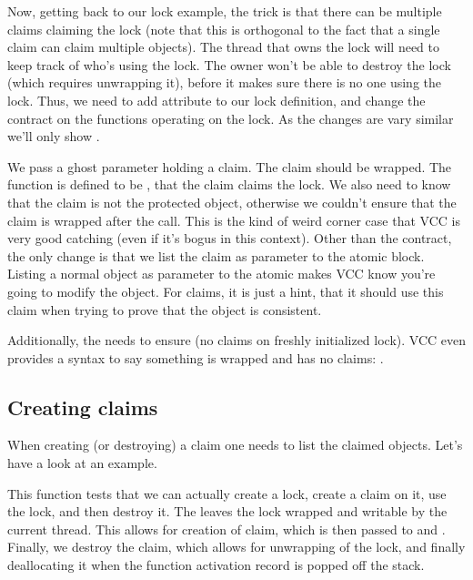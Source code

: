 Now, getting back to our lock example, the trick is that there can be
multiple claims claiming the lock (note that this is orthogonal to
the fact that a single claim can claim multiple objects).
The thread that owns the lock will need to keep track of who's using
the lock.
The owner won't be able to destroy the lock (which requires unwrapping it),
before it makes sure there is no one using the lock.
Thus, we need to add  attribute to our lock
definition, and change the contract on the functions operating
on the lock. As the changes are vary similar we'll only
show .


\noindent
We pass a ghost parameter holding a claim.
The claim should be wrapped.
The function  is defined to be
, \ie that the claim claims the lock.
We also need to know that the claim is not the protected object,
otherwise we couldn't ensure that the claim is wrapped after the call.
This is the kind of weird corner case that VCC is very good catching
(even if it's bogus in this context).
Other than the contract, the only change is that we list the claim
as parameter to the atomic block.
Listing a normal object as parameter to the atomic makes VCC know you're
going to modify the object.
For claims, it is just a hint, that it should use this claim when trying
to prove that the object is consistent.

Additionally, the  needs to ensure  
(\ie no claims on freshly initialized lock).
VCC even provides a syntax to say something is wrapped and has no claims: .

\subsection{Creating claims}
\label{sect:creating-claims}

When creating (or destroying) a claim one needs to list the claimed objects.
Let's have a look at an example.


This function tests that we can actually create a lock, create a claim on it,
use the lock, and then destroy it.
The  leaves the lock wrapped and writable by the current thread.
This allows for creation of claim, which is then passed to  and .
Finally, we destroy the claim, which allows for unwrapping of the lock, and finally deallocating
it when the function activation record is popped off the stack.

